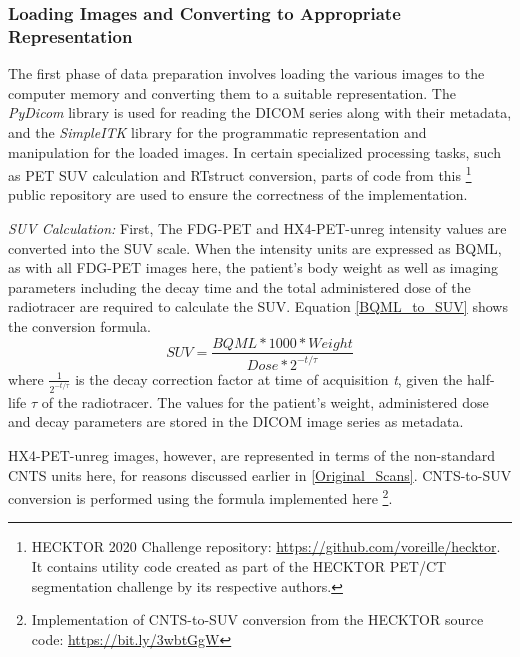 \subsubsection{Loading Images and Converting to Appropriate Representation}
The first phase of data preparation involves loading the various images to the computer memory and converting them to a suitable representation. The \textit{PyDicom} library is used for reading the DICOM series along with their metadata, and the \textit{SimpleITK} library for the programmatic representation and manipulation for the loaded images. In certain specialized processing tasks, such as PET SUV calculation and RTstruct conversion, parts of code from this \footnote{HECKTOR 2020 Challenge repository: \url{https://github.com/voreille/hecktor}. It contains utility code created as part of the HECKTOR PET/CT segmentation challenge \cite{andrearczyk2020overview} by its respective authors.} public repository are used to ensure the correctness of the implementation.  

\vspace{4mm}
\noindent
\textit{SUV Calculation:} First, The FDG-PET and HX4-PET-unreg intensity values are converted into the SUV scale. When the intensity units are expressed as BQML, as with all FDG-PET images here, the patient's body weight as well as imaging parameters including the decay time and the total administered dose of the radiotracer are required to calculate the SUV. Equation \ref{BQML_to_SUV} shows the conversion formula. 
\begin{equation}
    SUV = \frac{BQML * 1000 * Weight}{Dose * 2^{-t/\tau}} 
    \label{BQML_to_SUV}
\end{equation}
where $\frac{1}{2^{-t/\tau}}$ is the decay correction factor at time of acquisition \textit{t}, given the half-life $\tau$ of the radiotracer. The values for the patient's weight, administered dose and decay parameters are stored in the DICOM image series as metadata. 

HX4-PET-unreg images, however, are represented in terms of the non-standard CNTS units here, for reasons discussed earlier in \ref{Original_Scans}. CNTS-to-SUV conversion is performed using the formula implemented here \footnote{Implementation of CNTS-to-SUV conversion from the HECKTOR source code: \url{https://bit.ly/3wbtGgW}}.

